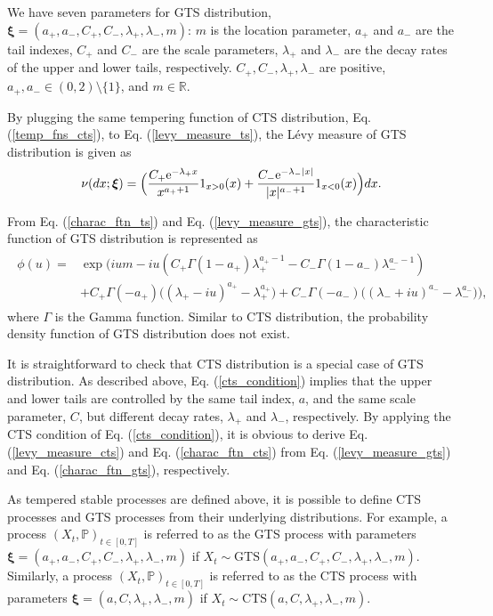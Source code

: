 \documentclass[preprint,11pt]{amsart}
\begin{document}
	We have seven parameters for GTS distribution, $\boldsymbol{\xi}=(a_+, a_-, C_+, C_-,\lambda_+,\lambda_-,m)$: $m$ is the location parameter, $a_+$ and $a_-$ are the tail indexes, $C_+$ and $C_-$ are the scale parameters, $\lambda_+$ and $\lambda_-$ are the decay rates of the upper and lower tails, respectively. $C_+, C_-, \lambda_+,\lambda_-$ are positive, $a_+, a_-\in(0,2)\setminus \{1\}$, and $m\in\mathbb{R}$.
	
	By plugging the same tempering function of CTS distribution, Eq. (\ref{temp_fns_cts}), to Eq. (\ref{levy_measure_ts}), the L\'evy measure of GTS distribution \cite{rachev2011financial} is given as
	\begin{align}
	\label{levy_measure_gts}
		\nu(dx;\boldsymbol{\xi})=\Big(\frac{C_+{\rm e}^{-\lambda_+ x}}{x^{a_++1}} 1_{x>0}(x)+\frac{C_-{\rm e}^{-\lambda_- |x|}}{|x|^{a_-+1}} 1_{x<0}(x)\Big)dx.
	\end{align}
	
	From Eq. (\ref{charac_ftn_ts}) and Eq. (\ref{levy_measure_gts}), the characteristic function of GTS distribution \cite{rachev2011financial} is represented as
	\begin{align}
	\label{charac_ftn_gts}
	\begin{split}
		\phi(u)=&\exp\big(ium-iu(C_+\Gamma(1-a_+)\lambda_+^{a_+-1}-C_-\Gamma(1-a_-)\lambda_-^{a_--1})\\
		&+C_+\Gamma(-a_+)\big((\lambda_+-iu)^{a_{+}}-\lambda_+^{a_{+}}\big)+C_-\Gamma(-a_-) \big((\lambda_-+iu)^{a_{-}}-\lambda_-^{a_{-}}\big)\big),
	\end{split}
	\end{align}
	where $\Gamma$ is the Gamma function. Similar to CTS distribution, the probability density function of GTS distribution does not exist.
		
	It is straightforward to check that CTS distribution is a special case of GTS distribution. As described above, Eq. (\ref{cts_condition}) implies that the upper and lower tails are controlled by the same tail index, $a$, and the same scale parameter, $C$, but different decay rates, $\lambda_{+}$ and $\lambda_{-}$, respectively. By applying the CTS condition of Eq. (\ref{cts_condition}), it is obvious to derive Eq. (\ref{levy_measure_cts}) and Eq. (\ref{charac_ftn_cts}) from Eq. (\ref{levy_measure_gts}) and Eq. (\ref{charac_ftn_gts}), respectively.
	
	 As tempered stable processes are defined above, it is possible to define CTS processes and GTS processes from their underlying distributions. For example, a process $(X_t, \mathbb{P})_{t\in[0,T]}$ is referred to as the GTS process with parameters $\boldsymbol{\xi}=(a_+, a_-, C_+, C_-, \lambda_+, \lambda_-, m)$ if $X_t\sim\mathrm{GTS}(a_+, a_-, C_+, C_-,\lambda_+,\lambda_-,m)$. Similarly, a process $(X_t, \mathbb{P})_{t\in[0,T]}$ is referred to as the CTS process with parameters $\boldsymbol{\xi}=(a, C, \lambda_+, \lambda_-, m)$ if $X_t\sim\mathrm{CTS}(a, C, \lambda_+, \lambda_-, m)$.
	
\end{document}
